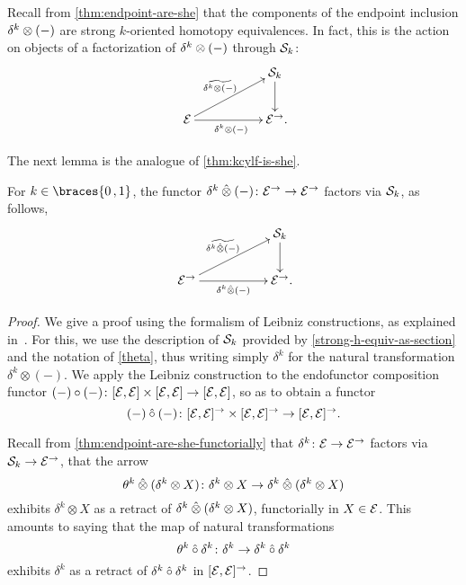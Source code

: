 \documentclass[reqno,10pt,a4paper,oneside,draft]{amsart}
\begin{document}
{{\begin{remark} \label{thm:endpoint-are-she-functorially}
Recall from \cref{thm:endpoint-are-she} that the components of the endpoint inclusion $\kcyl \otimes (-)$ are strong $k$-oriented homotopy equivalences.
In fact, this is the action on objects of a factorization of $\kcyl \otimes (-)$ through $\cal{S}_k$:
\[
\xymatrix@C+3em{
&
  \cal{S}_k
  \ar[d]
\\
  \cal{E}
  \ar[r]_{\kcyl \otimes (-)}
  \ar[ur]^{\widetilde{\kcyl \otimes (-)}}
&
  \cal{E}^\to
\rlap{.}}
\]
\end{remark}

The next lemma is the analogue of \cref{thm:kcylf-is-she}.

\begin{lemma} \label{thm:kcylf-is-she-alg}
For $k \in \braces{0\,, 1}$, the functor $\kcyl \hatotimes (-) \co \cal{E}^\to \to \cal{E}^\to$ factors via $\cal{S}_k$, as follows,
\[
\xymatrix@C+3em{
&
  \cal{S}_k
  \ar[d]
\\
  \cal{E}^\to
  \ar[r]_-{\kcyl \hatotimes (-)}
  \ar[ur]^-{\widetilde{\kcyl \hatotimes (-)}\,}
&
  \cal{E}^\to
\rlap{.}}
\]
\end{lemma}

\begin{proof} We give a proof using the formalism of Leibniz constructions, as explained in~\cite{riehl-verity:reedy}.
For this, we use the description of $\cal{S}_k$ provided by \cref{strong-h-equiv-as-section} and the notation of \cref{theta},
thus writing simply $\delta^k$ for the natural transformation $\delta^k \otimes (-)$.
We apply the Leibniz construction to the endofunctor composition functor
$(-) \cc (-) \co [\cal{E}, \cal{E}] \times [\cal{E}, \cal{E}] \to [\cal{E}, \cal{E}]$, so as to obtain a functor
\[
(-) \mathbin{\hat{\cc}} (-) \co [\cal{E}, \cal{E}]^\to \times [\cal{E}, \cal{E}]^\to \to [\cal{E}, \cal{E}]^\to
.\]

Recall from \cref{thm:endpoint-are-she-functorially} that $\delta^k \co \cal{E} \to \cal{E}^\to$ factors via $\cal{S}_k \to \cal{E}^\to$, \ie that
the arrow
\[
\theta^k \hatotimes (\delta^k \otimes X) \co \delta^k \otimes X \to \delta^k \hatotimes (\delta^k \otimes X)
\]
exhibits $\delta^k \otimes X$ as a retract of $\delta^k \hatotimes (\delta^k \otimes X)$, functorially in $X \in \cal{E}$.
This amounts to saying that the map of natural transformations
\[
\theta^k \mathbin{\hat{\cc}} \delta^k \co \delta^k \to \delta^k \mathbin{\hat{\cc}} \delta^k
\]
exhibits $\delta^k$ as a retract of $\delta^k \mathbin{\hat{\cc}} \delta^k$ in $[\cal{E}, \cal{E}]^\to$.


\end{proof}}}
\end{document}
